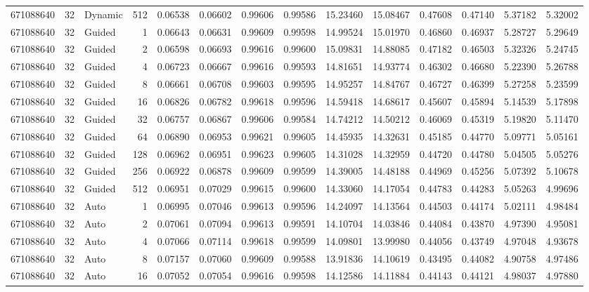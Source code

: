 \begin{tabular}{rrlrrrrrrrrrrr}
671088640 & 32 & Dynamic & 512 & 0.06538 & 0.06602 & 0.99606 & 0.99586 & 15.23460 & 15.08467 & 0.47608 & 0.47140 & 5.37182 & 5.32002 \\
671088640 & 32 & Guided & 1 & 0.06643 & 0.06631 & 0.99609 & 0.99598 & 14.99524 & 15.01970 & 0.46860 & 0.46937 & 5.28727 & 5.29649 \\
671088640 & 32 & Guided & 2 & 0.06598 & 0.06693 & 0.99616 & 0.99600 & 15.09831 & 14.88085 & 0.47182 & 0.46503 & 5.32326 & 5.24745 \\
671088640 & 32 & Guided & 4 & 0.06723 & 0.06667 & 0.99616 & 0.99593 & 14.81651 & 14.93774 & 0.46302 & 0.46680 & 5.22390 & 5.26788 \\
671088640 & 32 & Guided & 8 & 0.06661 & 0.06708 & 0.99603 & 0.99595 & 14.95257 & 14.84767 & 0.46727 & 0.46399 & 5.27258 & 5.23599 \\
671088640 & 32 & Guided & 16 & 0.06826 & 0.06782 & 0.99618 & 0.99596 & 14.59418 & 14.68617 & 0.45607 & 0.45894 & 5.14539 & 5.17898 \\
671088640 & 32 & Guided & 32 & 0.06757 & 0.06867 & 0.99606 & 0.99584 & 14.74212 & 14.50212 & 0.46069 & 0.45319 & 5.19820 & 5.11470 \\
671088640 & 32 & Guided & 64 & 0.06890 & 0.06953 & 0.99621 & 0.99605 & 14.45935 & 14.32631 & 0.45185 & 0.44770 & 5.09771 & 5.05161 \\
671088640 & 32 & Guided & 128 & 0.06962 & 0.06951 & 0.99623 & 0.99605 & 14.31028 & 14.32959 & 0.44720 & 0.44780 & 5.04505 & 5.05276 \\
671088640 & 32 & Guided & 256 & 0.06922 & 0.06878 & 0.99609 & 0.99599 & 14.39005 & 14.48188 & 0.44969 & 0.45256 & 5.07392 & 5.10678 \\
671088640 & 32 & Guided & 512 & 0.06951 & 0.07029 & 0.99615 & 0.99600 & 14.33060 & 14.17054 & 0.44783 & 0.44283 & 5.05263 & 4.99696 \\
671088640 & 32 & Auto & 1 & 0.06995 & 0.07046 & 0.99613 & 0.99596 & 14.24097 & 14.13564 & 0.44503 & 0.44174 & 5.02111 & 4.98484 \\
671088640 & 32 & Auto & 2 & 0.07061 & 0.07094 & 0.99613 & 0.99591 & 14.10704 & 14.03846 & 0.44084 & 0.43870 & 4.97390 & 4.95081 \\
671088640 & 32 & Auto & 4 & 0.07066 & 0.07114 & 0.99618 & 0.99599 & 14.09801 & 13.99980 & 0.44056 & 0.43749 & 4.97048 & 4.93678 \\
671088640 & 32 & Auto & 8 & 0.07157 & 0.07060 & 0.99609 & 0.99588 & 13.91836 & 14.10619 & 0.43495 & 0.44082 & 4.90758 & 4.97486 \\
671088640 & 32 & Auto & 16 & 0.07052 & 0.07054 & 0.99616 & 0.99598 & 14.12586 & 14.11884 & 0.44143 & 0.44121 & 4.98037 & 4.97880 \\

\end{tabular}
